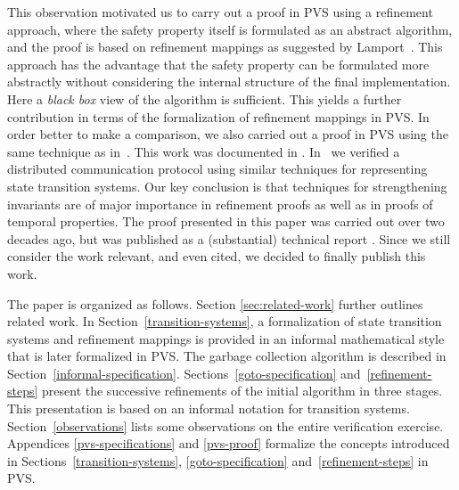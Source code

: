 This  observation motivated  us  to  carry  out a   proof  in PVS
\cite{pvs-url} using   a  refinement approach,  where   the
safety property  itself  is formulated  as an  abstract algorithm, and
the proof  is  based  on refinement  mappings  as suggested  by
Lamport~\cite{TLA:TOPLAS94}.  This  approach   has the advantage  that  the
safety property can  be formulated more abstractly without considering
the internal structure of the final implementation.  Here a {\em black
  box} view   of the  algorithm is   sufficient.  This yields a
further contribution in terms of the 
formalization of refinement mappings in PVS.
In  order   better to make  a
comparison, we also carried out a proof in PVS using the same
technique   as  in~\cite{Rus:GC}.  This    work   was documented  in
\cite{havelund-pvs-gc-99}.
%
In~\cite{HS:BRP}  we verified  a  distributed communication  protocol
using similar techniques for representing  state transition systems. 
Our  key conclusion  is  that  techniques for
strengthening invariants are  of major importance in refinement
proofs as well as in proofs of temporal properties.  
%
The proof presented in this paper was carried out over two decades ago, but
was published as a (substantial) technical report \cite{havelund-shankar-gc-report-97}. 
Since we still consider the work relevant, and even
cited, we decided to finally publish this work.

The paper is organized as follows.
Section \ref{sec:related-work} further 
outlines related work.
In  Section~\ref{transition-systems},  a    formalization of state
transition  systems and  refinement mappings  is  provided in  an informal
mathematical style that  is  later formalized  in  PVS.  The garbage
collection algorithm is described in
Section~\ref{informal-specification}\@.
Sections~\ref{goto-specification} and~\ref{refinement-steps} present
the successive refinements of the initial algorithm in three stages.
This presentation is based on   an informal notation for  transition systems.
Section~\ref{observations} lists some observations on the entire
verification exercise. 
Appendices \ref{pvs-specifications} and \ref{pvs-proof} formalize
the concepts  introduced   in   Sections~\ref{transition-systems},
\ref{goto-specification} and~\ref{refinement-steps} in PVS.   



